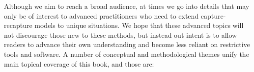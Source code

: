 Although we aim to reach a broad audience, at times we go into details
that may only be of interest to advanced practitioners who need to
extend capture-recapture models to unique situations.  We hope that
these advanced topics will not discourage those new to these methods,
but instead out intent is to allow readers to advance their own
understanding and become less reliant on restrictive tools and
software.
A number of conceptual and methodological
themes unify the main topical coverage of this book, and those are:

